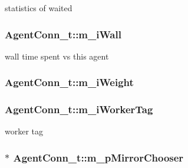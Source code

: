 statistics of waited 

\hypertarget{structAgentConn__t_a07c96676f202daee7f9cf3e1869f55e7}{
\subsubsection[{m\-\_\-i\-Wall}]{ Agent\-Conn\-\_\-t\-::m\-\_\-i\-Wall}}\label{structAgentConn__t_a07c96676f202daee7f9cf3e1869f55e7}


wall time spent vs this agent 

\hypertarget{structAgentConn__t_aa30e153ed1e6de625b3a8535b615f5e5}{
\subsubsection[{m\-\_\-i\-Weight}]{ Agent\-Conn\-\_\-t\-::m\-\_\-i\-Weight}}\label{structAgentConn__t_aa30e153ed1e6de625b3a8535b615f5e5}
\hypertarget{structAgentConn__t_a293275c6b9072ed5074553a073b389a9}{
\subsubsection[{m\-\_\-i\-Worker\-Tag}]{ Agent\-Conn\-\_\-t\-::m\-\_\-i\-Worker\-Tag}}\label{structAgentConn__t_a293275c6b9072ed5074553a073b389a9}


worker tag 

\hypertarget{structAgentConn__t_a4dd1c818ec6ec01e16d867b406f7b348}{
\subsubsection[{m\-\_\-p\-Mirror\-Chooser}]{$\ast$ Agent\-Conn\-\_\-t\-::m\-\_\-p\-Mirror\-Chooser}}\label{structAgentConn__t_a4dd1c818ec6ec01e16d867b406f7b348}


